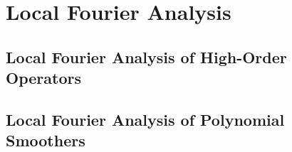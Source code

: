 \chapter{Local Fourier Analysis}\label{ch:LocalFourierAnalysis}


\section{Local Fourier Analysis of High-Order Operators}\label{sec:lfahighorder}


\section{Local Fourier Analysis of Polynomial Smoothers}\label{sec:lfasmoothers}
